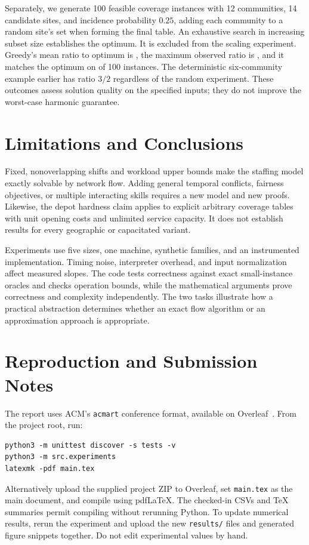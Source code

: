 \documentclass[sigconf,nonacm]{acmart}
\begin{document}
Separately, we generate 100 feasible coverage instances with 12 communities,
14 candidate sites, and incidence probability $0.25$, adding each community
to a random site's set when forming the final table. An exhaustive search
in increasing subset size establishes the optimum. It is excluded from the
scaling experiment. Greedy's mean ratio to optimum is
\QualityMeanRatio{}, the maximum observed ratio is \QualityMaxRatio{}, and
it matches the optimum on \QualityOptimalCount{} of 100 instances.
The deterministic six-community example earlier has ratio $3/2$ regardless
of the random experiment. These outcomes assess solution quality on the
specified inputs; they do not improve the worst-case harmonic guarantee.

\section{Limitations and Conclusions}
Fixed, nonoverlapping shifts and workload upper bounds make the staffing
model exactly solvable by network flow. Adding general temporal conflicts,
fairness objectives, or multiple interacting skills requires a new model and
new proofs. Likewise, the depot hardness claim applies to explicit arbitrary
coverage tables with unit opening costs and unlimited service capacity.
It does not establish results for every geographic or capacitated variant.

Experiments use five sizes, one machine, synthetic families, and an
instrumented implementation. Timing noise, interpreter overhead, and
input normalization affect measured slopes. The code tests correctness
against exact small-instance oracles and checks operation bounds, while
the mathematical arguments prove correctness and complexity independently.
The two tasks illustrate how a practical abstraction determines whether an
exact flow algorithm or an approximation approach is appropriate.




\clearpage
\appendix
\section{Reproduction and Submission Notes}
The report uses ACM's \texttt{acmart} conference format, available on
Overleaf~\cite{template}. From the project root, run:
\begin{Verbatim}[fontsize=\small,breaklines=true]
python3 -m unittest discover -s tests -v
python3 -m src.experiments
latexmk -pdf main.tex
\end{Verbatim}
Alternatively upload the supplied project ZIP to Overleaf, set
\texttt{main.tex} as the main document, and compile using pdfLaTeX.
The checked-in CSVs and TeX summaries permit compiling without rerunning
Python. To update numerical results, rerun the experiment and upload the new
\texttt{results/} files and generated figure snippets together. Do not edit
experimental values by hand.
\end{document}

